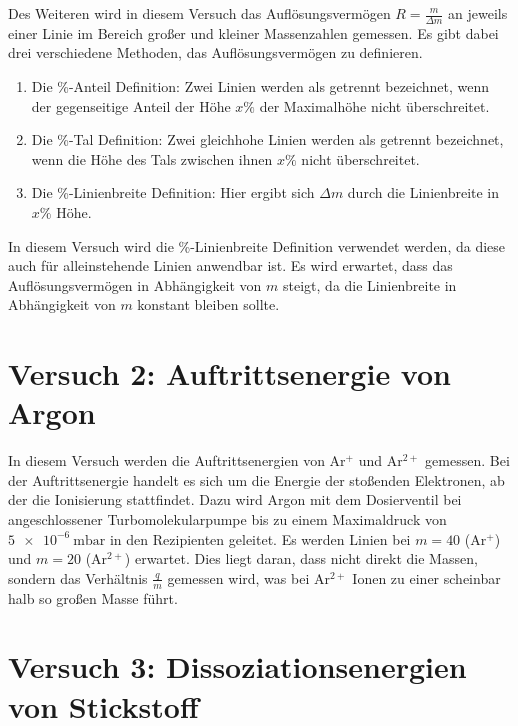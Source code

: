Des Weiteren wird in diesem Versuch das Auflösungsvermögen $R=\frac{m}{\Delta m}$ an jeweils einer Linie im Bereich großer und kleiner Massenzahlen gemessen. Es gibt dabei drei verschiedene Methoden, das Auflösungsvermögen zu definieren.
\begin{enumerate}
 \item Die \%-Anteil Definition: Zwei Linien werden als getrennt bezeichnet, wenn der gegenseitige Anteil der Höhe $x\%$ der Maximalhöhe nicht überschreitet.
 \item Die \%-Tal Definition: Zwei gleichhohe Linien werden als getrennt bezeichnet, wenn die Höhe des Tals zwischen ihnen $x\%$ nicht überschreitet.
 \item Die \%-Linienbreite Definition: Hier ergibt sich $\Delta m$ durch die Linienbreite in $x\%$ Höhe.
\end{enumerate}
In diesem Versuch wird die \%-Linienbreite Definition verwendet werden, da diese auch für alleinstehende Linien anwendbar ist. Es wird erwartet, dass das Auflösungsvermögen in Abhängigkeit von $m$ steigt, da die Linienbreite in Abhängigkeit von $m$ konstant bleiben sollte.

\section{Versuch 2: Auftrittsenergie von Argon}

In diesem Versuch werden die Auftrittsenergien von Ar$^{+}$ und Ar$^{2+}$ gemessen. Bei der Auftrittsenergie handelt es sich um die Energie der stoßenden Elektronen, ab der die Ionisierung stattfindet.
Dazu wird Argon mit dem Dosierventil bei angeschlossener Turbomolekularpumpe bis zu einem Maximaldruck von $\SI{5e-6}{\milli\bar}$ in den Rezipienten geleitet. Es werden Linien bei $m=40$ (Ar$^{+}$) und $m=20$ (Ar$^{2+}$) erwartet. Dies liegt daran, dass nicht direkt die Massen, sondern das Verhältnis $\frac{q}{m}$ gemessen wird, was bei Ar$^{2+}$ Ionen zu einer scheinbar halb so großen Masse führt.

\section{Versuch 3: Dissoziationsenergien von Stickstoff}
\label{sec:v3}

